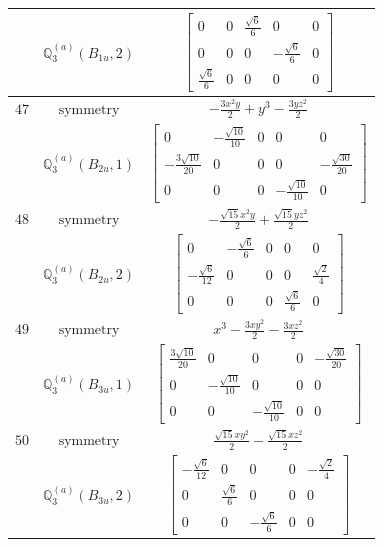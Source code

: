 \documentclass[fleqn,8pt,landscape]{jsarticle}
\begin{document}
\begin{longtable}{ccc}
$  $ & $ \mathbb{Q}_{3}^{(a)}(B_{1u},2) $ & $ \begin{bmatrix} 0 & 0 & \frac{\sqrt{6}}{6} & 0 & 0 \\ 0 & 0 & 0 & - \frac{\sqrt{6}}{6} & 0 \\ \frac{\sqrt{6}}{6} & 0 & 0 & 0 & 0 \end{bmatrix} $ \\ \hline
$ 47 $ & $ \text{symmetry} $ & $ - \frac{3 x^{2} y}{2} + y^{3} - \frac{3 y z^{2}}{2} $ \\
$  $ & $ \mathbb{Q}_{3}^{(a)}(B_{2u},1) $ & $ \begin{bmatrix} 0 & - \frac{\sqrt{10}}{10} & 0 & 0 & 0 \\ - \frac{3 \sqrt{10}}{20} & 0 & 0 & 0 & - \frac{\sqrt{30}}{20} \\ 0 & 0 & 0 & - \frac{\sqrt{10}}{10} & 0 \end{bmatrix} $ \\ \hline
$ 48 $ & $ \text{symmetry} $ & $ - \frac{\sqrt{15} x^{2} y}{2} + \frac{\sqrt{15} y z^{2}}{2} $ \\
$  $ & $ \mathbb{Q}_{3}^{(a)}(B_{2u},2) $ & $ \begin{bmatrix} 0 & - \frac{\sqrt{6}}{6} & 0 & 0 & 0 \\ - \frac{\sqrt{6}}{12} & 0 & 0 & 0 & \frac{\sqrt{2}}{4} \\ 0 & 0 & 0 & \frac{\sqrt{6}}{6} & 0 \end{bmatrix} $ \\ \hline
$ 49 $ & $ \text{symmetry} $ & $ x^{3} - \frac{3 x y^{2}}{2} - \frac{3 x z^{2}}{2} $ \\
$  $ & $ \mathbb{Q}_{3}^{(a)}(B_{3u},1) $ & $ \begin{bmatrix} \frac{3 \sqrt{10}}{20} & 0 & 0 & 0 & - \frac{\sqrt{30}}{20} \\ 0 & - \frac{\sqrt{10}}{10} & 0 & 0 & 0 \\ 0 & 0 & - \frac{\sqrt{10}}{10} & 0 & 0 \end{bmatrix} $ \\ \hline
$ 50 $ & $ \text{symmetry} $ & $ \frac{\sqrt{15} x y^{2}}{2} - \frac{\sqrt{15} x z^{2}}{2} $ \\
$  $ & $ \mathbb{Q}_{3}^{(a)}(B_{3u},2) $ & $ \begin{bmatrix} - \frac{\sqrt{6}}{12} & 0 & 0 & 0 & - \frac{\sqrt{2}}{4} \\ 0 & \frac{\sqrt{6}}{6} & 0 & 0 & 0 \\ 0 & 0 & - \frac{\sqrt{6}}{6} & 0 & 0 \end{bmatrix} $ \\ \hline

\end{longtable}
\end{document}
